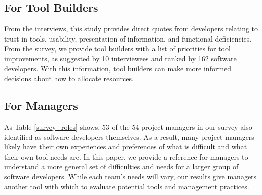 \subsection{For Tool Builders}
From the interviews, this study provides direct quotes from developers relating to trust in tools, usability, presentation of information, and functional deficiencies. From the survey, we provide tool builders with a list of priorities for tool improvements, as suggested by 10 interviewees and ranked by 162 software developers. With this information, tool builders can make more informed decisions about how to allocate resources.

\subsection{For Managers}
As Table \ref{survey_roles} shows, 53 of the 54 project managers in our survey also identified as software developers themselves. As a result, many project managers likely have their own experiences and preferences of what is difficult and what their own tool needs are. In this paper, we provide a reference for managers to understand a more general set of difficulties and needs for a larger group of software developers. While each team's needs will vary, our results give managers another tool with which to evaluate potential tools and management practices.